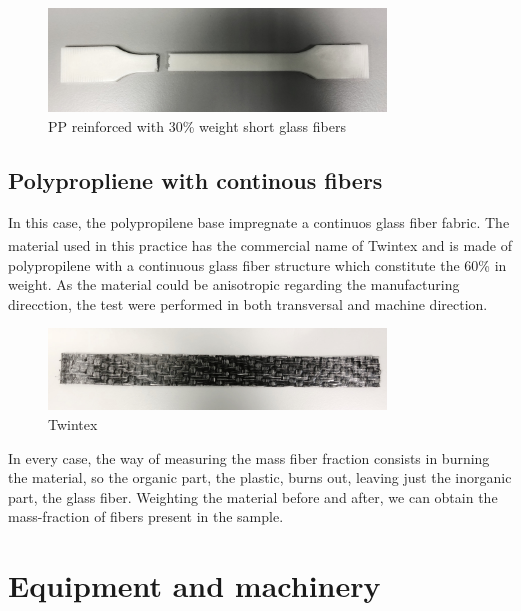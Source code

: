 \begin{figure}[h]
	\centering
	\includegraphics[width=0.8\textwidth]{img/2_PP_short_glass_fibre.jpg}
	\caption[PP + 30wt]{PP reinforced with 30\% weight short glass fibers}
	\label{fig:PP30}
\end{figure}

\subsection{Polypropliene with continous fibers}

In this case, the polypropilene base impregnate a continuos glass fiber fabric.
The material used in this practice has the commercial name of Twintex\textsuperscript{\tiny\textregistered}
and is made of polypropilene with a continuous glass fiber structure which constitute
the 60\% in weight. As the material could be anisotropic regarding the manufacturing
direcction, the test were performed in both transversal and machine direction.\\

\begin{figure}[h]
	\centering
	\includegraphics[width=0.8\textwidth]{img/3_Twintex.jpg}
	\caption[Twintex]{Twintex}
	\label{fig:twintex}
\end{figure}

In every case, the way of measuring the mass fiber fraction consists in burning
the material, so the organic part, the plastic, burns out, leaving just the
inorganic part, the glass fiber. Weighting the material before and after, we can
obtain the mass-fraction of fibers present in the sample.\\

\section{Equipment and machinery}

